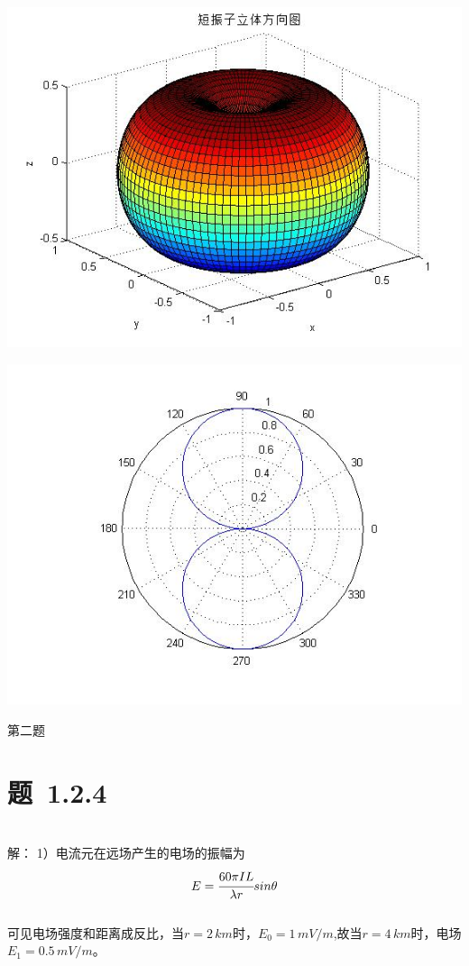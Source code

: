 \documentclass[a4paper,12pt]{article}
\begin{document}
\begin{minipage}{0.5\textwidth}

\includegraphics[width=\linewidth]{pictures/antenna_3dimension.jpg}
\end{minipage}%
\begin{minipage}{0.5\textwidth}
\includegraphics[width=\textwidth]{pictures/antenna_polar.jpg}%
\end{minipage}





\newpage
\textcolor[rgb]{0,0,1}{\huge{第二题}}
\section{ 题~1.2.4}
\textbf{}\\
\newline
解： 1）电流元在远场产生的电场的振幅为
$$E=\cfrac{60\pi IL}{\lambda r}sin\theta$$
\\
可见电场强度和距离成反比，当$r=2\,km$时，$E_0=1\,mV/m$,故当$r=4\,km$时，电场$E_1=0.5\,mV/m$。\\
\end{document}
